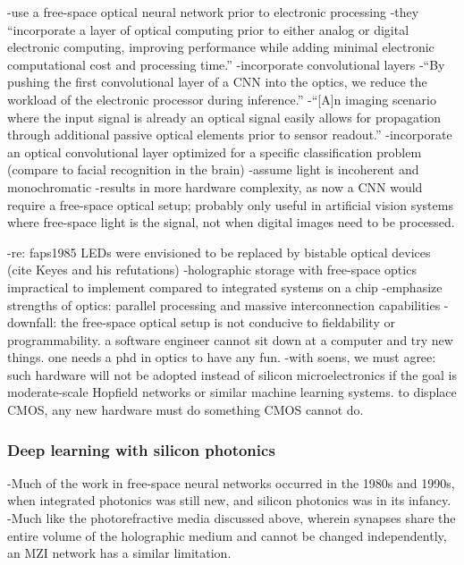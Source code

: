 \cite{chsi2018}
-use a free-space optical neural network prior to electronic processing
-they ``incorporate a layer of optical computing prior to either analog or digital electronic computing, improving performance while adding minimal electronic computational cost and processing time.''
-incorporate convolutional layers
-``By pushing the first convolutional layer of a CNN into the optics, we reduce the workload of the electronic processor during inference.''
-``[A]n imaging scenario where the input signal is already an optical signal easily allows for propagation through additional passive optical elements prior to sensor readout.''
-incorporate an optical convolutional layer optimized for a specific classification problem (compare to facial recognition in the brain)
-assume light is incoherent and monochromatic
-results in more hardware complexity, as now a CNN would require a free-space optical setup; probably only useful in artificial vision systems where free-space light is the signal, not when digital images need to be processed.

-re: faps1985 LEDs were envisioned to be replaced by bistable optical devices (cite Keyes and his refutations)
-holographic storage with free-space optics impractical to implement compared to integrated systems on a chip
-emphasize strengths of optics: parallel processing and massive interconnection capabilities
-downfall: the free-space optical setup is not conducive to fieldability or programmability. a software engineer cannot sit down at a computer and try new things. one needs a phd in optics to have any fun.
-with soens, we must agree: such hardware will not be adopted instead of silicon microelectronics if the goal is moderate-scale Hopfield networks or similar machine learning systems. to displace CMOS, any new hardware must do something CMOS cannot do.


\subsubsection{Deep learning with silicon photonics}
-Much of the work in free-space neural networks occurred in the 1980s and 1990s, when integrated photonics was still new, and silicon photonics was in its infancy.
-Much like the photorefractive media discussed above, wherein synapses share the entire volume of the holographic medium and cannot be changed independently, an MZI network has a similar limitation.

